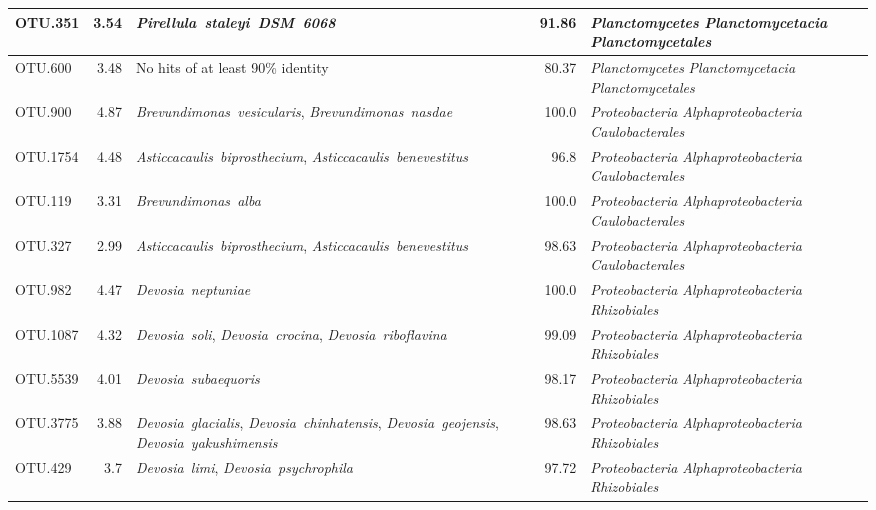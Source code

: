 \begin{longtable}{lrP{5cm}rP{7cm}}
OTU.351 & 3.54 & \mbox{\textit{Pirellula staleyi DSM 6068}} & 91.86 & \mbox{\textit{Planctomycetes}} \mbox{\textit{Planctomycetacia}} \mbox{\textit{Planctomycetales}} \\ \midrule
OTU.600 & 3.48 & {No hits of at least 90\% identity} & 80.37 & \mbox{\textit{Planctomycetes}} \mbox{\textit{Planctomycetacia}} \mbox{\textit{Planctomycetales}} \\ \midrule
OTU.900 & 4.87 & \mbox{\textit{Brevundimonas vesicularis}}, \mbox{\textit{Brevundimonas nasdae}} & 100.0 & \mbox{\textit{Proteobacteria}} \mbox{\textit{Alphaproteobacteria}} \mbox{\textit{Caulobacterales}} \\ \midrule
OTU.1754 & 4.48 & \mbox{\textit{Asticcacaulis biprosthecium}}, \mbox{\textit{Asticcacaulis benevestitus}} & 96.8 & \mbox{\textit{Proteobacteria}} \mbox{\textit{Alphaproteobacteria}} \mbox{\textit{Caulobacterales}} \\ \midrule
OTU.119 & 3.31 & \mbox{\textit{Brevundimonas alba}} & 100.0 & \mbox{\textit{Proteobacteria}} \mbox{\textit{Alphaproteobacteria}} \mbox{\textit{Caulobacterales}} \\ \midrule
OTU.327 & 2.99 & \mbox{\textit{Asticcacaulis biprosthecium}}, \mbox{\textit{Asticcacaulis benevestitus}} & 98.63 & \mbox{\textit{Proteobacteria}} \mbox{\textit{Alphaproteobacteria}} \mbox{\textit{Caulobacterales}} \\ \midrule
OTU.982 & 4.47 & \mbox{\textit{Devosia neptuniae}} & 100.0 & \mbox{\textit{Proteobacteria}} \mbox{\textit{Alphaproteobacteria}} \mbox{\textit{Rhizobiales}} \\ \midrule
OTU.1087 & 4.32 & \mbox{\textit{Devosia soli}}, \mbox{\textit{Devosia crocina}}, \mbox{\textit{Devosia riboflavina}} & 99.09 & \mbox{\textit{Proteobacteria}} \mbox{\textit{Alphaproteobacteria}} \mbox{\textit{Rhizobiales}} \\ \midrule
OTU.5539 & 4.01 & \mbox{\textit{Devosia subaequoris}} & 98.17 & \mbox{\textit{Proteobacteria}} \mbox{\textit{Alphaproteobacteria}} \mbox{\textit{Rhizobiales}} \\ \midrule
OTU.3775 & 3.88 & \mbox{\textit{Devosia glacialis}}, \mbox{\textit{Devosia chinhatensis}}, \mbox{\textit{Devosia geojensis}}, \mbox{\textit{Devosia yakushimensis}} & 98.63 & \mbox{\textit{Proteobacteria}} \mbox{\textit{Alphaproteobacteria}} \mbox{\textit{Rhizobiales}} \\ \midrule
OTU.429 & 3.7 & \mbox{\textit{Devosia limi}}, \mbox{\textit{Devosia psychrophila}} & 97.72 & \mbox{\textit{Proteobacteria}} \mbox{\textit{Alphaproteobacteria}} \mbox{\textit{Rhizobiales}} \\ \midrule

\end{longtable}
